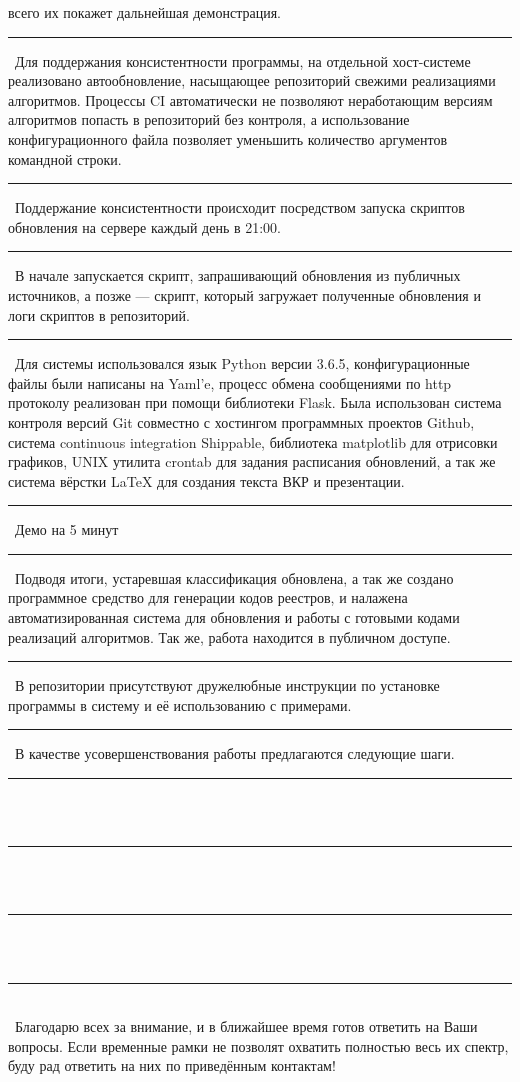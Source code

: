 \documentclass[12pt]{article}
\renewcommand{\line}{\noindent\rule{\textwidth}{1pt}}
\begin{document}
всего их покажет дальнейшая демонстрация.\\
\line\
Для поддержания консистентности программы, на отдельной хост-системе
реализовано автообновление, насыщающее репозиторий свежими реализациями
алгоритмов. Процессы CI автоматически не позволяют неработающим версиям
алгоритмов попасть в репозиторий без контроля, а использование
конфигурационного файла позволяет уменьшить количество аргументов командной
строки.\\
\line\
Поддержание консистентности происходит посредством запуска скриптов обновления
на сервере каждый день в 21:00.\\
\line\
В начале запускается скрипт, запрашивающий обновления из публичных источников,
а позже --- скрипт, который загружает полученные обновления и логи скриптов в
репозиторий.\\
\line\
Для системы использовался язык Python версии 3.6.5, конфигурационные файлы были
написаны на Yaml'e, процесс обмена сообщениями по http протоколу реализован при
помощи библиотеки Flask. Была использован система контроля версий Git совместно
с хостингом программных проектов Github, система continuous integration
Shippable, библиотека matplotlib для отрисовки графиков, UNIX утилита crontab
для задания расписания обновлений, а так же система вёрстки {\LaTeX} для
создания текста ВКР и презентации.\\
\line\
Демо на 5 минут\\
\line\
Подводя итоги, устаревшая классификация обновлена, а так же создано программное
средство для генерации кодов реестров, и налажена автоматизированная система
для обновления и работы с готовыми кодами реализаций алгоритмов. Так же, работа
находится в публичном доступе.\\
\line\
В репозитории присутствуют дружелюбные инструкции по установке программы в
систему и её использованию с примерами.\\
\line\
В качестве усовершенствования работы предлагаются следующие шаги.\\
\line\\\
\line\\\
\line\\\
\line\\\
Благодарю всех за внимание, и в ближайшее время готов ответить на Ваши вопросы.
Если временные рамки не позволят охватить полностью весь их спектр, буду рад
ответить на них по приведённым контактам!


\end{document}
